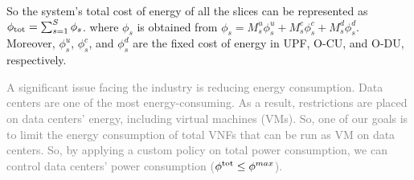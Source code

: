 \documentclass[lettersize,journal]{IEEEtran}
\begin{document}
So the system's total cost of energy of all the slices can be represented as $\textstyle \phi_{\text{\text{tot}}} = \sum_{s=1}^{S}\phi_{s}$.
where $\phi_{s}$ is obtained from $\phi_{s} = M_s^u \phi_s^u + M_s^c \phi_s^c+ M_s^d \phi_s^d.$
Moreover, $\phi_s^u$, $\phi_s^c$, and $\phi_s^d$ are the fixed cost of energy in UPF, O-CU, and O-DU, respectively. 

\textcolor{gray}{A significant issue facing the industry is reducing energy consumption. Data centers are one of the most energy-consuming. As a result, restrictions are placed on data centers' energy, including virtual machines (VMs). So, one of our goals is to limit the energy consumption of total VNFs that can be run as VM on data centers. So, by applying a custom policy on total power consumption, we can control data centers' power consumption ($\phi^{\text{\text{tot}}}  \leq \phi^{max}$).}
\end{document}
